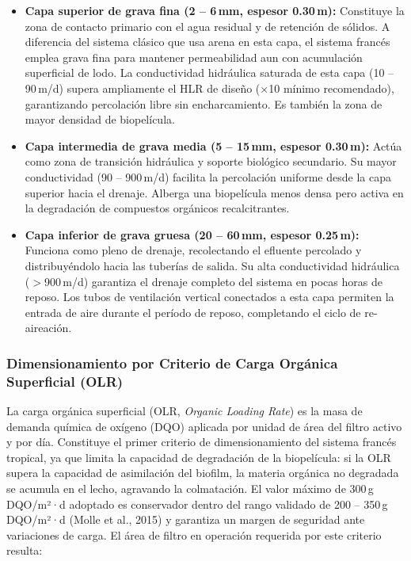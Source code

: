 \begin{itemize}[noitemsep,leftmargin=2em]
    \item \textbf{Capa superior de grava fina (2 -- 6\,mm, espesor 0.30\,m):} Constituye la zona de contacto primario con el agua residual y de retención de sólidos. A diferencia del sistema clásico que usa arena en esta capa, el sistema francés emplea grava fina para mantener permeabilidad aun con acumulación superficial de lodo. La conductividad hidráulica saturada de esta capa (10 -- 90\,m/d) supera ampliamente el HLR de diseño ($\times$10 mínimo recomendado), garantizando percolación libre sin encharcamiento. Es también la zona de mayor densidad de biopelícula.
    \item \textbf{Capa intermedia de grava media (5 -- 15\,mm, espesor 0.30\,m):} Actúa como zona de transición hidráulica y soporte biológico secundario. Su mayor conductividad (90 -- 900\,m/d) facilita la percolación uniforme desde la capa superior hacia el drenaje. Alberga una biopelícula menos densa pero activa en la degradación de compuestos orgánicos recalcitrantes.
    \item \textbf{Capa inferior de grava gruesa (20 -- 60\,mm, espesor 0.25\,m):} Funciona como pleno de drenaje, recolectando el efluente percolado y distribuyéndolo hacia las tuberías de salida. Su alta conductividad hidráulica ($>$900\,m/d) garantiza el drenaje completo del sistema en pocas horas de reposo. Los tubos de ventilación vertical conectados a esta capa permiten la entrada de aire durante el período de reposo, completando el ciclo de re-aireación.
\end{itemize}

\subsubsection*{Dimensionamiento por Criterio de Carga Orgánica Superficial (OLR)}

La carga orgánica superficial (OLR, \textit{Organic Loading Rate}) es la masa de demanda química de oxígeno (DQO) aplicada por unidad de área del filtro activo y por día. Constituye el primer criterio de dimensionamiento del sistema francés tropical, ya que limita la capacidad de degradación de la biopelícula: si la OLR supera la capacidad de asimilación del biofilm, la materia orgánica no degradada se acumula en el lecho, agravando la colmatación. El valor máximo de 300\,g\,DQO/m²·d adoptado es conservador dentro del rango validado de 200 -- 350\,g\,DQO/m²·d (Molle et al., 2015) y garantiza un margen de seguridad ante variaciones de carga. El área de filtro en operación requerida por este criterio resulta:

